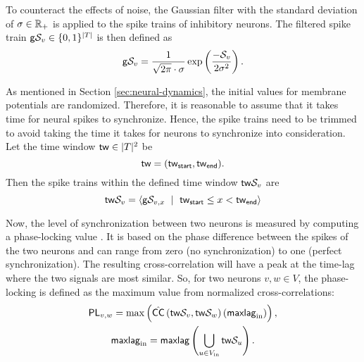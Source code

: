 To counteract the effects of noise, the Gaussian filter with the standard deviation of $\sigma \in \mathbb{R}_+$ is applied to the spike trains of inhibitory neurons. The filtered spike train $\mathsf{g}\mathcal{S}_v \in \{0, 1\}^{|T|}$ is then defined as
\begin{equation}
    \mathsf{g}\mathcal{S}_v = \frac{1}{\sqrt{2 \pi} \cdot \sigma} \exp \left( 
        \frac{-\mathcal{S}_v}{2 \sigma^2}
    \right).
\end{equation}

As mentioned in Section \ref{sec:neural-dynamics}, the initial values for membrane potentials are randomized. Therefore, it is reasonable to assume that it takes time for neural spikes to synchronize. Hence, the spike trains need to be trimmed to avoid taking the time it takes for neurons to synchronize into consideration. Let the time window $\mathsf{tw} \in |T|^2$ be
\begin{equation}
    \mathsf{tw} = (\mathsf{tw}_{\mathsf{start}}, \mathsf{tw}_{\mathsf{end}}).
\end{equation}
Then the spike trains within the defined time window $\mathsf{tw}\mathcal{S}_{v}$ are
\begin{equation}
    \mathsf{tw}\mathcal{S}_{v} = 
    \left<
        \mathsf{g}\mathcal{S}_{v, x}
        \ \mid \
        \mathsf{tw}_{\mathsf{start}} 
        \leq 
        x
        <
        \mathsf{tw}_{\mathsf{end}}
    \right>
\end{equation}

Now, the level of synchronization between two neurons is measured by computing a phase-locking value \cite{Lowet2015}. 
It is based on the phase difference between the spikes of the two neurons and can range from zero (no synchronization) to one (perfect synchronization).
The resulting cross-correlation will have a peak at the time-lag where the two signals are most similar.
So, for two neurons $v, w \in V$, the phase-locking 
is defined as the maximum value from normalized cross-correlations:
\begin{equation}
\begin{gathered}
    \mathsf{PL}_{v, w} = 
    \max \left(
        \hat{\mathsf{CC}} \left(
            \mathsf{tw}\mathcal{S}_{v}, \mathsf{tw}\mathcal{S}_{w}
        \right)\left(
            \mathsf{maxlag}_{\mathrm{in}}
        \right)
    \right),
    \\
    \mathsf{maxlag}_{\mathrm{in}} = \mathsf{maxlag} \left (\bigcup_{u \in V_{\mathrm{in}}} \mathsf{tw}\mathcal{S}_{u} \right).
\end{gathered}
\end{equation}

